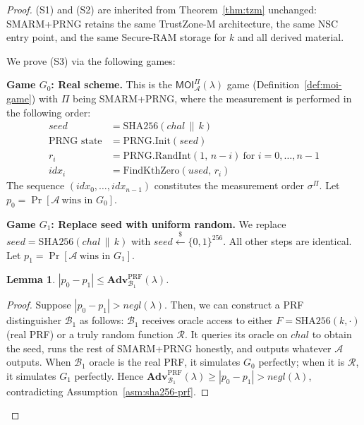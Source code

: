 \documentclass{ieeeaccess}
\newcommand{\rtsmarmone}{SMARM+PRNG\xspace}
\newtheorem{lemma}{Lemma}[section]
\newcommand{\Adv}{\mathbf{Adv}}
\begin{document}
\begin{proof}
(S1) and (S2) are inherited from Theorem~\ref{thm:tzm} unchanged:
SMARM+PRNG retains the same TrustZone-M architecture, the same NSC entry
point, and the same Secure-RAM storage for $k$ and all derived material.
 
We prove (S3) via the following games:
 
\medskip
\noindent\textbf{Game $G_0$: Real scheme.}
This is the $\mathsf{MOI}^\Pi_{\mathcal{A}}(\lambda)$ game
(Definition~\ref{def:moi-game}) with $\Pi$ being \rtsmarmone, where the measurement is performed in the following order:
\begin{align*}
  \mathit{seed}    &= \mathrm{SHA256}(\mathit{chal} \,\|\, k) \\
  \text{PRNG state} &= \mathrm{PRNG.Init}(\mathit{seed}) \\
  r_i              &= \mathrm{PRNG.RandInt}(1,\, n-i)
                      \ \text{for } i = 0,\dots,n-1 \\
  \mathit{idx}_i   &= \mathrm{FindKthZero}(\mathit{used},\, r_i)
\end{align*}
The sequence $(\mathit{idx}_0,\dots,\mathit{idx}_{n-1})$ constitutes the
measurement order $\sigma^\Pi$.
Let $p_0 = \Pr[\mathcal{A}\ \text{wins in } G_0]$.
 
\medskip
\noindent\textbf{Game $G_1$: Replace seed with uniform random.}
We replace $\mathit{seed} = \mathrm{SHA256}(\mathit{chal} \,\|\, k)$ with
$\mathit{seed} \xleftarrow{\$} \{0,1\}^{256}$.
All other steps are identical.
Let $p_1 = \Pr[\mathcal{A}\ \text{wins in } G_1]$.
 
\begin{lemma}
\label{lem:g0-g1}
$|p_0 - p_1| \leq \Adv^{\mathrm{PRF}}_{\mathcal{B}_1}(\lambda)$.
\end{lemma}
\begin{proof}
Suppose $|p_0 - p_1| > negl(\lambda)$.
Then, we can construct a PRF distinguisher $\mathcal{B}_1$ as follows:
$\mathcal{B}_1$ receives oracle access to either $F = \mathrm{SHA256}(k,\cdot)$
(real PRF) or a truly random function $\mathcal{R}$.
It queries its oracle on $\mathit{chal}$ to obtain the seed, runs the rest
of \rtsmarmone honestly, and outputs whatever $\mathcal{A}$ outputs.
When $\mathcal{B}_1$ oracle is the real PRF, it simulates $G_0$ perfectly;
when it is $\mathcal{R}$, it simulates $G_1$ perfectly.
Hence $\Adv^{\mathrm{PRF}}_{\mathcal{B}_1}(\lambda) \ge |p_0 - p_1| > negl(\lambda)$,
contradicting Assumption~\ref{asm:sha256-prf}.
\end{proof}
 

\end{proof}
\end{document}
